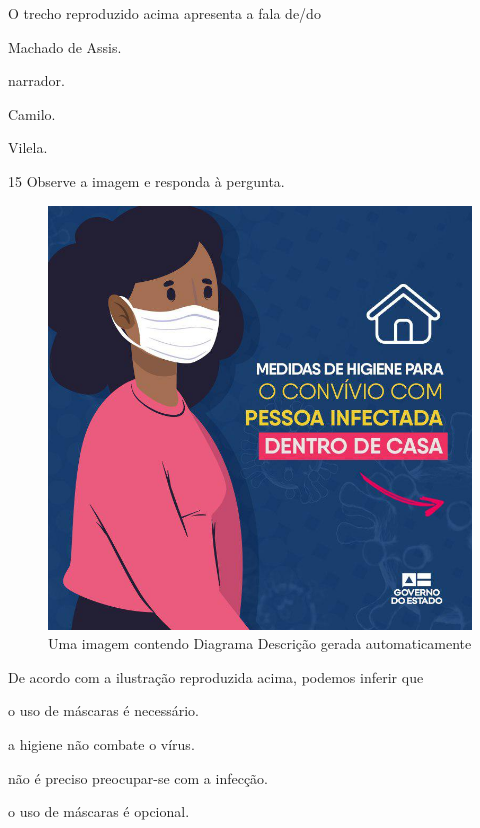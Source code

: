 O trecho reproduzido acima apresenta a fala de/do

\begin{escolha}
  \item Machado de Assis.

  \item narrador.

  \item Camilo.

  \item Vilela.
\end{escolha}


\pagebreak
\num{15} Observe a imagem e responda à pergunta.

\begin{figure}[htpb!]
\centering
\includegraphics[width=.8\textwidth]{./imgQ4PORT/media/image5.jpeg}
\caption{Uma imagem contendo Diagrama Descrição gerada automaticamente}
\end{figure}


De acordo com a ilustração reproduzida acima, podemos inferir que

\begin{escolha}
  \item o uso de máscaras é necessário.

  \item a higiene não combate o vírus.

  \item não é preciso preocupar-se com a infecção.

  \item o uso de máscaras é opcional.
\end{escolha}


